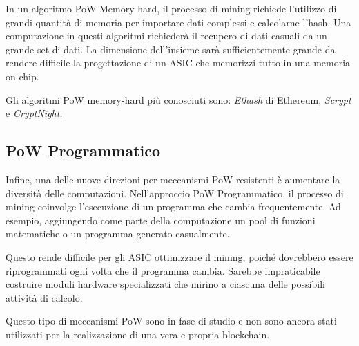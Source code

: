 In un algoritmo PoW Memory-hard, il processo di mining richiede l'utilizzo di grandi quantità di memoria per importare dati complessi e calcolarne l'hash.
Una computazione in questi algoritmi richiederà il recupero di dati casuali da un grande set di dati. 
La dimensione dell'insieme sarà sufficientemente grande da rendere difficile la progettazione di un ASIC che memorizzi tutto in una memoria on-chip.

Gli algoritmi PoW memory-hard più conosciuti sono: \textit{Ethash} di Ethereum, \textit{Scrypt} e \textit{CryptNight}. 

    


\subsection{PoW Programmatico}
Infine, una delle nuove direzioni per meccanismi PoW resistenti è aumentare la diversità delle computazioni. 
Nell'approccio PoW Programmatico, il processo di mining coinvolge l'esecuzione di un programma che cambia frequentemente. 
Ad esempio, aggiungendo come parte della computazione un pool di funzioni matematiche o un programma generato casualmente. 

Questo rende difficile per gli ASIC ottimizzare il mining, poiché dovrebbero essere riprogrammati ogni volta che il programma cambia.
Sarebbe impraticabile costruire moduli hardware specializzati che mirino a ciascuna delle possibili attività di calcolo.  

Questo tipo di meccanismi PoW sono in fase di studio e non sono ancora stati utilizzati per la realizzazione di una vera e propria blockchain.


